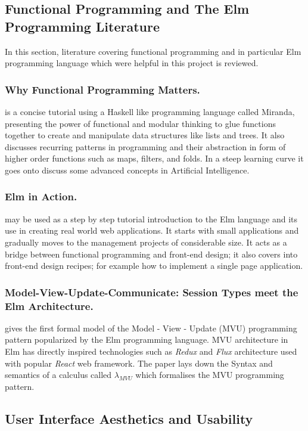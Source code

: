 \subsection{Functional Programming and The Elm Programming Literature}
In this section, literature covering functional programming and in particular
Elm programming language which were helpful in this project is reviewed.

\subsubsection{Why Functional Programming Matters.}
\cite{Hughes89} is a concise tutorial using a Haskell like programming language
called Miranda, presenting the power of functional and modular thinking to glue
functions together to create and manipulate data structures like lists and
trees. It also discusses recurring patterns in programming and their
abstraction in form of higher order functions such as maps, filters, and folds.
In a steep learning curve it goes onto discuss some advanced concepts in
Artificial Intelligence.


\subsubsection{Elm in Action.}
\cite{feldman2020elm} may be used as a step by step tutorial introduction to the Elm
language and its use in creating real world web applications. It starts with
small applications and gradually moves to the management projects of
considerable size. It acts as a bridge between functional programming and
front-end design; it also covers into front-end design recipes; for example how
to implement a single page application.

\subsubsection{Model-View-Update-Communicate: Session Types meet the Elm Architecture.}
\cite{FowlerElm} gives the first formal model of the Model - View - Update
(MVU) programming pattern popularized by the Elm programming language. MVU
architecture in Elm has directly inspired technologies such as \emph{Redux} and
\emph{Flux} architecture used with popular \emph{React} web framework. The
paper lays down the Syntax and semantics of a calculus called $\lambda_{MVU}$
which formalises the MVU programming pattern. 


\subsection{User Interface Aesthetics and Usability}
